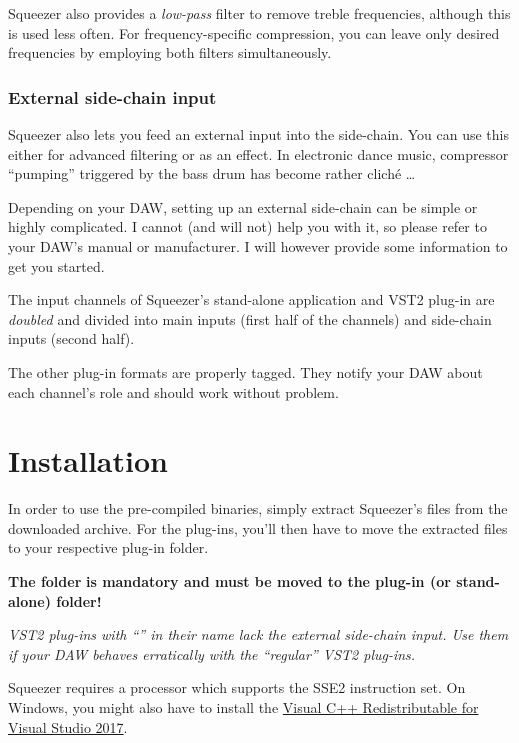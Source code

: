 Squeezer also provides a \emph{low-pass} filter to remove treble
frequencies, although this is used less often.  For frequency-specific
compression, you can leave only desired frequencies by employing both
filters simultaneously.

\subsection{External side-chain input}
\label{sec:external_side_chain}

Squeezer also lets you feed an external input into the side-chain.
You can use this either for advanced filtering or as an effect.  In
electronic dance music, compressor ``pumping'' triggered by the bass
drum has become rather cliché \dots

Depending on your DAW, setting up an external side-chain can be simple
or highly complicated.  I cannot (and will not) help you with it, so
please refer to your DAW's manual or manufacturer.  I will however
provide some information to get you started.

The input channels of Squeezer's stand-alone application and VST2
plug-in are \emph{doubled} and divided into main inputs (first half of
the channels) and side-chain inputs (second half).

The other plug-in formats are properly tagged.  They notify your DAW
about each channel's role and should work without problem.

\chapter{Installation}
\label{chap:installation}

In order to use the pre-compiled binaries, simply extract Squeezer's
files from the downloaded archive.  For the plug-ins, you'll then have
to move the extracted files to your respective plug-in folder.

\textbf{The folder}  \textbf{is mandatory and must be
  moved to the plug-in (or stand-alone) folder!}

\emph{VST2 plug-ins with \emph{``''} in their name
  lack the external side-chain input.  Use them if your DAW behaves
  erratically with the ``regular'' VST2 plug-ins.}

Squeezer requires a processor which supports the SSE2 instruction set.
On Windows, you might also have to install the
\href{https://www.visualstudio.com/downloads/}{Visual C++
  Redistributable for Visual Studio 2017}.

